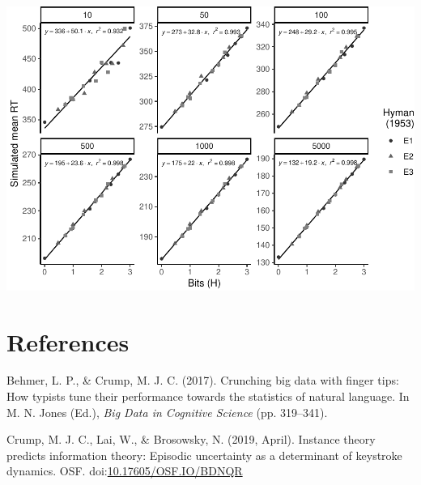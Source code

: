 \documentclass[,man,floatsintext]{apa6}
\begin{document}
\includegraphics{Supplemental_materials_files/figure-latex/unnamed-chunk-1-1.pdf}

\hypertarget{references}{%
\section{References}\label{references}}

\begingroup
\setlength{\parindent}{-0.5in}
\setlength{\leftskip}{0.5in}

\hypertarget{refs}{}
\leavevmode\hypertarget{ref-behmer_crunching_2017}{}%
Behmer, L. P., \& Crump, M. J. C. (2017). Crunching big data with finger tips: How typists tune their performance towards the statistics of natural language. In M. N. Jones (Ed.), \emph{Big Data in Cognitive Science} (pp. 319--341).

\leavevmode\hypertarget{ref-Crump_Lai_Brosowsky_2018}{}%
Crump, M. J. C., Lai, W., \& Brosowsky, N. (2019, April). Instance theory predicts information theory: Episodic uncertainty as a determinant of keystroke dynamics. OSF. doi:\href{https://doi.org/10.17605/OSF.IO/BDNQR}{10.17605/OSF.IO/BDNQR}

\endgroup
\end{document}
